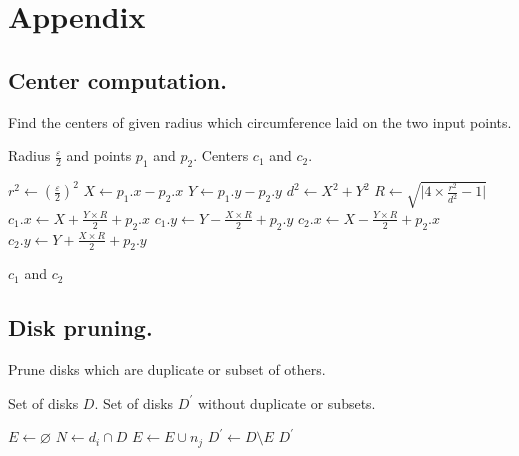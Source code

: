 \clearpage
\appendix

\renewcommand\appendixname{}
\renewcommand\appendixpagename{}
\renewcommand{\thechapter}{}
\renewcommand{\thesection}{\Alph{section}}

\chapter{Appendix}
\section{Center computation.}
{\ssp
\begin{algorithm}[h!]
    \caption{Find the centers of given radius which circumference laid on the two input points.}
    \begin{algorithmic}[1]
        \Require Radius $\frac{\varepsilon}{2}$ and points $p_1$ and $p_2$.
        \Ensure Centers $c_1$ and $c_2$.
        
        \State $r^2 \gets (\frac{\varepsilon}{2})^2$
        \State $X \gets p_1.x - p_2.x$
        \State $Y \gets p_1.y - p_2.y$
        \State $d^2 \gets X^2 + Y^2$
        \State $R \gets \sqrt{\lvert 4 \times \frac{r^2}{d^2} - 1 \rvert}$
        \State $c_1.x \gets X + \frac{Y \times R}{2} + p_2.x$
        \State $c_1.y \gets Y - \frac{X \times R}{2} + p_2.y$
        \State $c_2.x \gets X - \frac{Y \times R}{2} + p_2.x$
        \State $c_2.y \gets Y + \frac{X \times R}{2} + p_2.y$
        
        \State \Return $c_1$ and $c_2$
        \EndFunction
    \end{algorithmic}
    \label{app:centers}
\end{algorithm}
}

\clearpage
\section{Disk pruning.}
{\ssp
\begin{algorithm}[h!]
    \caption{Prune disks which are duplicate or subset of others.}
     \begin{algorithmic}[1]
         \Require Set of disks $D$.
         \Ensure Set of disks $D^{\prime}$ without duplicate or subsets.
         
         \State $E \gets \varnothing$
             \State $N \gets d_i \cap D$
                         \State $E \gets E \cup {n_j}$
                 \EndIf
             \EndFor
         \EndFor        
         \State $D^{\prime} \gets D \setminus E$
         \State \Return $D^{\prime}$
         \EndFunction
     \end{algorithmic}
    \label{app:disks}
\end{algorithm}
}

